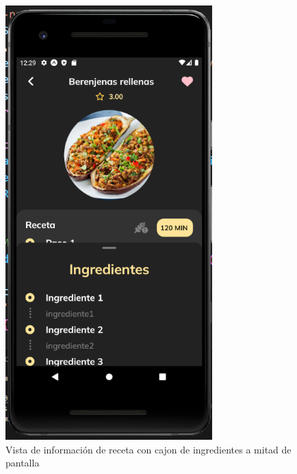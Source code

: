 \begin{figure}[!h]
  \centering
  \includegraphics[width=8cm, scale=1]{Images/Imagenes/inforeceta3.png}
  \caption{Vista de información de receta con cajon de ingredientes a mitad de pantalla}
  \label{fig:inforeceta3}
\end{figure}

